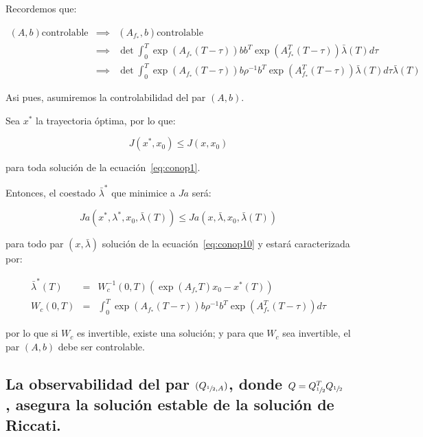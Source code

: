             Recordemos que:

            \begin{eqnarray*}
                (A, b) \text{controlable} & \implies & (A_{f_*}, b) \text{controlable} \\
                & \implies & \det{\int_0^T \exp{(A_{f_*}(T - \tau))} b b^T \exp{(A_{f_*}^T (T - \tau))} \bar{\lambda}(T) d\tau} \\
                & \implies & \det{\int_0^T \exp{(A_{f_*}(T - \tau))} b \rho^{-1} b^T \exp{(A_{f_*}^T (T - \tau))} \bar{\lambda}(T) d\tau \bar{\lambda}(T)}
            \end{eqnarray*}

            Asi pues, asumiremos la controlabilidad del par $(A, b)$.

            Sea $x^*$ la trayectoria óptima, por lo que:

            \begin{equation*}
                J(x^*, x_0) \le J(x, x_0)
            \end{equation*}

            para toda solución de la ecuación~\ref{eq:conop1}.

            Entonces, el coestado $\bar{\lambda}^*$ que minimice a $Ja$ será:

            \begin{equation*}
                Ja(x^*, \lambda^*, x_0, \bar{\lambda}(T)) \le Ja(x, \bar{\lambda}, x_0, \bar{\lambda}(T))
            \end{equation*}

            para todo par $(x, \bar{\lambda})$ solución de la ecuación~\ref{eq:conop10} y estará caracterizada por:

            \begin{eqnarray*}
                \bar{\lambda}^*(T) & = & W_c^{-1}(0, T) \left( \exp{(A_{f_*} T)} x_0 - x^*(T) \right) \\
                W_c (0, T) & = & \int_0^T \exp{\left( A_{f_*}(T-\tau) \right)} b \rho^{-1} b^T \exp{\left( A_{f_*}^T(T-\tau) \right)} d\tau
            \end{eqnarray*}

            por lo que si $W_c$ es invertible, existe una solución; y para que $W_c$ sea invertible, el par $(A, b)$ debe ser controlable.

        \subsection{La observabilidad del par $(Q_{\sfrac{1}{2} ,A})$, donde $Q = Q_{\sfrac{1}{2}}^T Q_{\sfrac{1}{2}}$ , asegura la solución estable de la solución de Riccati.}

